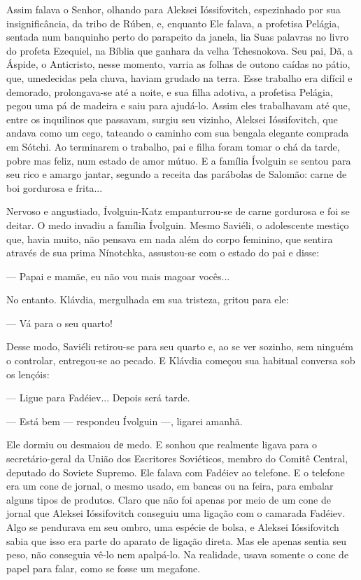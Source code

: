 Assim falava o Senhor, olhando para Aleksei Ióssifovitch, espezinhado
por sua insignificância, da tribo de Rúben, e, enquanto Ele falava, a
profetisa Pelágia, sentada num banquinho perto do parapeito da janela,
lia Suas palavras no livro do profeta Ezequiel, na Bíblia que ganhara da
velha Tchesnokova. Seu pai, Dã, a Áspide, o Anticristo, nesse momento,
varria as folhas de outono caídas no pátio, que, umedecidas pela chuva,
haviam grudado na terra. Esse trabalho era difícil e demorado,
prolongava-se até a noite, e sua filha adotiva, a profetisa Pelágia,
pegou uma pá de madeira e saiu para ajudá-lo. Assim eles trabalhavam até
que, entre os inquilinos que passavam, surgiu seu vizinho, Aleksei
Ióssifovitch, que andava como um cego, tateando o caminho com sua
bengala elegante comprada em Sótchi. Ao terminarem o trabalho, pai e
filha foram tomar o chá da tarde, pobre mas feliz, num estado de amor
mútuo. E a família Ívolguin se sentou para seu rico e amargo jantar,
segundo a receita das parábolas de Salomão: carne de boi gordurosa e
frita...

Nervoso e angustiado, Ívolguin-Katz empanturrou-se de carne gordurosa e
foi se deitar. O medo invadiu a família Ívolguin. Mesmo Saviéli, o
adolescente mestiço que, havia muito, não pensava em nada além do corpo
feminino, que sentira através de sua prima Nínotchka, assustou-se com o
estado do pai e disse:

--- Papai e mamãe, eu não vou mais magoar vocês...

No entanto. Klávdia, mergulhada em sua tristeza, gritou para ele:

--- Vá para o seu quarto!

Desse modo, Saviéli retirou-se para seu quarto e, ao se ver sozinho, sem
ninguém o controlar, entregou-se ao pecado. E Klávdia começou sua
habitual conversa sob os lençóis:

--- Ligue para Fadéiev... Depois será tarde.

--- Está bem --- respondeu Ívolguin ---, ligarei amanhã.

Ele dormiu ou desmaiou dе medo. E sonhou que realmente ligava para o
secretário-geral da União dos Escritores Soviéticos, membro do Comitê
Central, deputado do Soviete Supremo. Ele falava com Fadéiev ao
telefone. E o telefone era um cone de jornal, o mesmo usado, em bancas
ou na feira, para embalar alguns tipos de produtos. Claro que não foi
apenas por meio de um cone de jornal que Aleksei Ióssifovitch conseguiu
uma ligação com o camarada Fadéiev. Algo se pendurava em seu ombro, uma
espécie de bolsa, e Aleksei Ióssifovitch sabia que isso era parte do
aparato de ligação direta. Mas ele apenas sentia seu peso, não conseguia
vê-lo nem apalpá-lo. Na realidade, usava somente o cone de papel para
falar, como se fosse um megafone.

